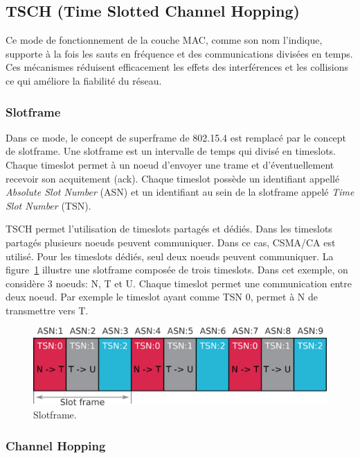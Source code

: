 \subsection*{TSCH (Time Slotted Channel Hopping)}\label{subsec:etat_art-802.15.4.tsch}

Ce mode de fonctionnement de la couche MAC, comme son nom l'indique, supporte à la fois les sauts en fréquence et des communications divisées en temps. Ces mécanismes réduisent efficacement les effets des interférences et les collisions ce qui améliore la fiabilité du réseau.

\subsubsection*{Slotframe}
Dans ce mode, le concept de superframe de 802.15.4 est remplacé par le concept de slotframe.
Une slotframe est un intervalle de temps qui divisé en timeslots. Chaque timeslot permet à un noeud d'envoyer une trame et d'éventuellement recevoir son acquitement (ack).
Chaque timeslot possède un identifiant appellé \textit{Absolute Slot Number} (ASN)
et un identifiant au sein de la slotframe appelé \textit{Time Slot Number} (TSN).

TSCH permet l'utilisation de timeslots partagés et dédiés. Dans les timeslots partagés plusieurs noeuds peuvent communiquer. Dans ce cas, CSMA/CA est utilisé. Pour les timeslots dédiés, seul deux noeuds peuvent communiquer. La figure~\ref{fig:state-slotframe} illustre une slotframe composée de trois timeslots.
Dans cet exemple, on considère 3 noeuds: N, T et U. Chaque timeslot permet une communication entre deux noeud.
Par exemple le timeslot ayant comme TSN 0, permet à N de transmettre vers T.

\begin{figure}[H]
  \centering
  \includegraphics[scale=0.7]{res/pictures/sloframe.png}
  \caption{Slotframe.}
  \label{fig:state-slotframe}
\end{figure}

\subsubsection*{Channel Hopping}

